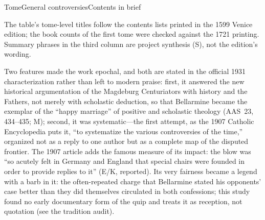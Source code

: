 \begin{threestable}{Tome}{General controversies}{Contents in brief}
\end{threestable}

\noindent The table's tome-level titles follow the contents lists
printed in the 1599 Venice edition; the book counts of the first
tome were checked against the 1721 printing. Summary phrases in the
third column are project synthesis (S), not the edition's wording.

Two features made the work epochal, and both are stated in the
official 1931 characterization rather than left to modern praise:
first, it answered the new historical argumentation of the
Magdeburg Centuriators with history and the Fathers, not merely
with scholastic deduction, so that Bellarmine became the exemplar
of the ``happy marriage'' of positive and scholastic theology
(AAS~23, 434--435; M); second, it was systematic---the first
attempt, as the 1907 Catholic Encyclopedia puts it, ``to
systematize the various controversies of the time,'' organized not
as a reply to one author but as a complete map of the disputed
frontier. The 1907 article adds the famous measure of its impact:
the blow was ``so acutely felt in Germany and England that special
chairs were founded in order to provide replies to it'' (E/K,
reported). Its very fairness became a legend with a barb in it: the
often-repeated charge that Bellarmine stated his opponents' case
better than they did themselves circulated in both confessions;
this study found no early documentary form of the quip and treats
it as reception, not quotation (see the tradition audit).

